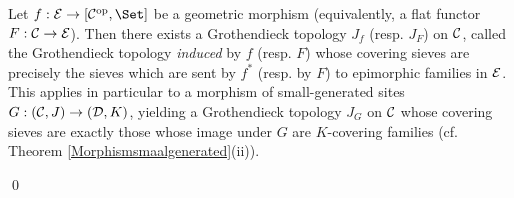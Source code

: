 \documentclass[a4paper,12pt]{article}
\begin{document}
\begin{proposition}\label{reminducedtopology}
	Let $f:{\cal E}\to [{\cal C}^{\textup{op}}, \Set]$ be a geometric morphism (equivalently, a flat functor $F:{\cal C}\to {\cal E}$). Then there exists a Grothendieck topology $J_{f}$ (resp. $J_{F}$) on $\cal C$, called the Grothendieck topology \emph{induced} by $f$ (resp. $F$) whose covering sieves are precisely the sieves which are sent by $f^{\ast}$ (resp. by $F$) to epimorphic families in $\cal E$. This applies in particular to a morphism of small-generated sites $G:({\cal C}, J)\to ({\cal D}, K)$, yielding a Grothendieck topology $J_{G}$ on $\cal C$ whose covering sieves are exactly those whose image under $G$ are $K$-covering families (cf. Theorem \ref{Morphismsmaalgenerated}(ii)).	  
\end{proposition}\qed
\end{document}
